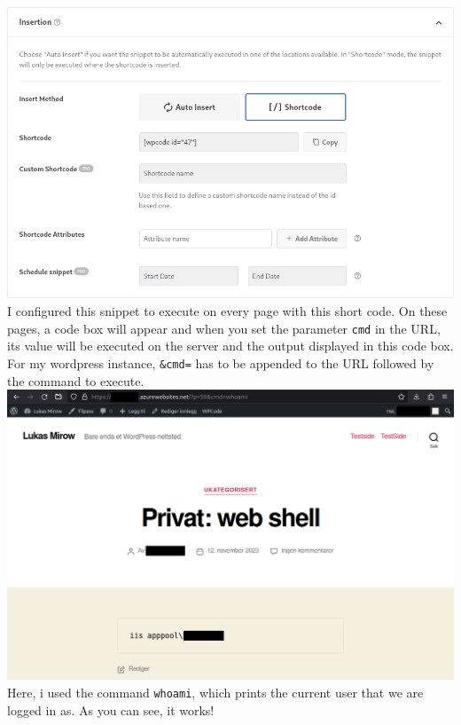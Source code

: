 \documentclass[12pt, a4paper]{article}
\begin{document}
				\includegraphics[width=\textwidth]{snippet-insertion.png}
				I configured this snippet to execute on every page with this short code. On these pages, a code box will appear and when you set the parameter \texttt{cmd} in the URL, its value will be executed on the server and the output displayed in this code box. For my wordpress instance, \texttt{\&cmd=} has to be appended to the URL followed by the command to execute.\\
				\includegraphics[width=\textwidth]{whoami.png}
				Here, i used the command \texttt{whoami}, which prints the current user that we are logged in as. As you can see, it works!
\end{document}
